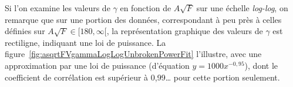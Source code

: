 	
	Si l'on examine les valeurs de $\gamma$ en fonction de $A\sqrt{F}$ sur une échelle \emph{log-log}, on remarque que sur une portion des données, correspondant à peu près à celles définies sur $A\sqrt{F} \in [180,\infty[$, la représentation graphique des valeurs de $\gamma$ est rectiligne, indiquant une loi de puissance. La figure~\ref{fig:asqrtFVgammaLogLogUnbrokenPowerFit} l'illustre, avec une approximation par une loi de puissance (d'équation $y = 1000x^{-0,95}$), dont le coefficient de corrélation est supérieur à 0,99\ldots{} pour cette portion seulement.
	
